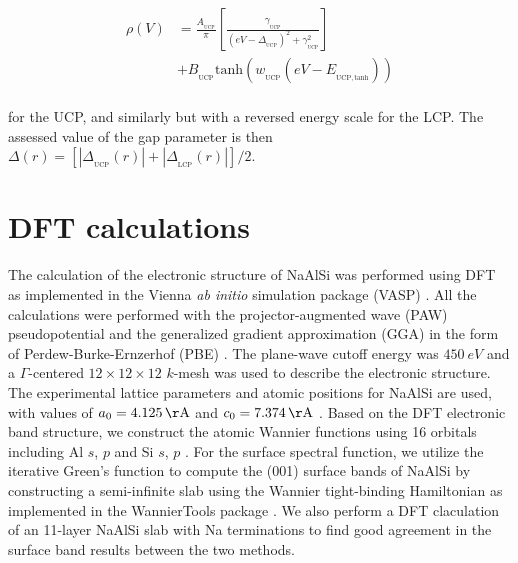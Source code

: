 \documentclass[reprint,superscriptaddress,prb,aps]{revtex4-2}
\begin{document}
\begin{equation}
\begin{aligned}
\rho(V) & = \frac{A_{_{\mathrm{UCP}}}}{\pi} \left[ \frac{\gamma_{_{\mathrm{UCP}}}}{(eV - \Delta_{_{\mathrm{UCP}}})^2 + \gamma_{_{\mathrm{UCP}}}^2} \right] \\
& + B_{_{\mathrm{UCP}}} \mathrm{tanh} \left(w_{_{\mathrm{UCP}}} \left(eV - E_{_{\mathrm{UCP,\mathrm{tanh}}}} \right) \right) \\
\end{aligned}
\end{equation}

for the UCP, and similarly but with a reversed energy scale for the LCP. The assessed value of the gap parameter is then $\Delta(r) = \left[ \left| \Delta_{_{\mathrm{UCP}}}(r) \right| + \left| \Delta_{_{\mathrm{LCP}}}(r) \right| \right] /2$.


\section{DFT calculations}

The calculation of the electronic structure of NaAlSi was performed using DFT as implemented in the Vienna \textit{ab initio} simulation package (VASP) \cite{Kresse1996a,Kresse1996b}.
All the calculations were performed with the projector-augmented wave (PAW) \cite{Blochl1994} pseudopotential and the generalized gradient approximation (GGA) in the form of Perdew-Burke-Ernzerhof (PBE) \cite{Perdew1996,Kresse1999}.
The plane-wave cutoff energy was $\SI{450}{eV}$ and a $\Gamma$-centered $12 \times 12 \times 12$ $k$-mesh was used to describe the electronic structure. The experimental lattice parameters and atomic positions for NaAlSi are used, with values of $a_{0} = \SI{4.125}{\AA}$ and $c_{0} = \SI{7.374}{\AA}$ \cite{Yamada2021}. Based on the DFT electronic band structure, we construct the atomic Wannier functions using 16 orbitals including Al $s$, $p$ and Si $s$, $p$ \cite{Pizzi2020}. For the surface spectral function, we utilize the iterative Green's function \cite{LopezSancho1985} to compute the (001) surface bands of NaAlSi by constructing a semi-infinite slab using the Wannier tight-binding Hamiltonian as implemented in the WannierTools package \cite{Wu2018}. We also perform a DFT claculation of an 11-layer NaAlSi slab with Na terminations to find good agreement in the surface band results between the two methods.
\end{document}
